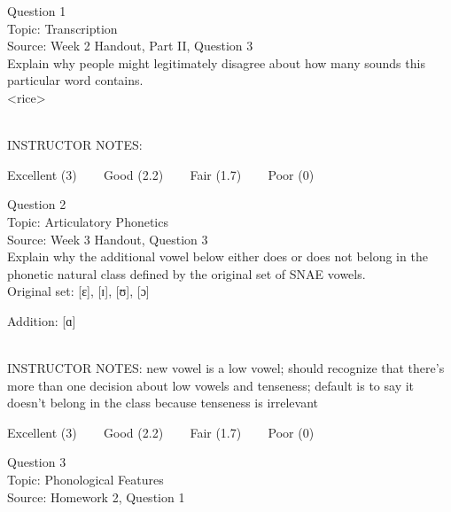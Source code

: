 \documentclass[12pt]{article}
\begin{document}
\begin{center}
\textbf{{\color{blue}{\HUGE START OF EXAM\\}}}

\textbf{{\color{blue}{\HUGE Student ID: 30263\\}}}

\textbf{{\color{blue}{\HUGE \\}}}

\end{center}
\newpage

{\large Question 1}\\

Topic: Transcription\\
Source: Week 2 Handout, Part II, Question 3\\

Explain why people might legitimately disagree about how many sounds this particular word contains.\\

<rice>


~\\
INSTRUCTOR NOTES: 


\vfill
Excellent (3) ~~~ Good (2.2) ~~~ Fair (1.7) ~~~ Poor (0)
\newpage

{\large Question 2}\\

Topic: Articulatory Phonetics\\
Source: Week 3 Handout, Question 3\\

Explain why the additional vowel below either does or does not belong in the phonetic natural class defined by the original set of SNAE vowels.\\

Original set: {[ɛ]}, {[ɪ]}, {[ʊ]}, {[ɔ]}

Addition: {[ɑ]}


~\\
INSTRUCTOR NOTES: new vowel is a low vowel; should recognize that there's more than one decision about low vowels and tenseness; default is to say it doesn't belong in the class because tenseness is irrelevant


\vfill
Excellent (3) ~~~ Good (2.2) ~~~ Fair (1.7) ~~~ Poor (0)
\newpage

{\large Question 3}\\

Topic: Phonological Features\\
Source: Homework 2, Question 1\\
\end{document}

